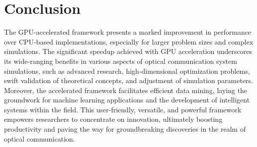

\section{Conclusion}
The GPU-accelerated framework presents a marked improvement in performance over CPU-based implementations, especially for larger problem sizes and complex simulations. The significant speedup achieved with GPU acceleration underscores its wide-ranging benefits in various aspects of optical communication system simulations, such as advanced research, high-dimensional optimization problems, swift validation of theoretical concepts, and adjustment of simulation parameters. Moreover, the accelerated framework facilitates efficient data mining, laying the groundwork for machine learning applications and the development of intelligent systems within the field. This user-friendly, versatile, and powerful framework empowers researchers to concentrate on innovation, ultimately boosting productivity and paving the way for groundbreaking discoveries in the realm of optical communication.
